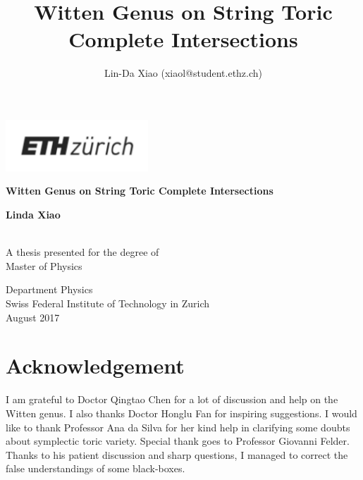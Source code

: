 \documentclass[11pt]{article}
\title{\bf Witten Genus on String Toric Complete Intersections}
\author{Lin-Da Xiao %
{\small(xiaol@student.ethz.ch)}}
\begin{document}
\begin{titlepage}
\includegraphics[width=0.4\textwidth]{Logo}
    \begin{center}
        \vspace*{1cm}
        \begin{Huge}
        \textbf{Witten Genus on String Toric Complete Intersections}
        \end{Huge}
        
        \vspace{1.5cm}
        
        \textbf{Linda Xiao}\\
        \vspace{1cm}
        \\
        \vfill
        
        A thesis presented for the degree of\\
        Master of Physics
        
        \vspace{0.8cm}
        
        
        
        Department Physics\\
        Swiss Federal Institute of Technology in Zurich\\
        August 2017
    \end{center}
\end{titlepage}
\newpage
\section*{Acknowledgement}
I am grateful to Doctor Qingtao Chen for a lot of discussion and help on the Witten genus. I also thanks Doctor Honglu Fan for inspiring suggestions.  I would like to thank Professor Ana da Silva for her kind help in clarifying some doubts about symplectic toric variety. Special thank goes to Professor Giovanni Felder. Thanks to his patient discussion and sharp questions, I managed to correct the false understandings of some black-boxes.
\newpage
\maketitle
\tableofcontents
\end{document}
